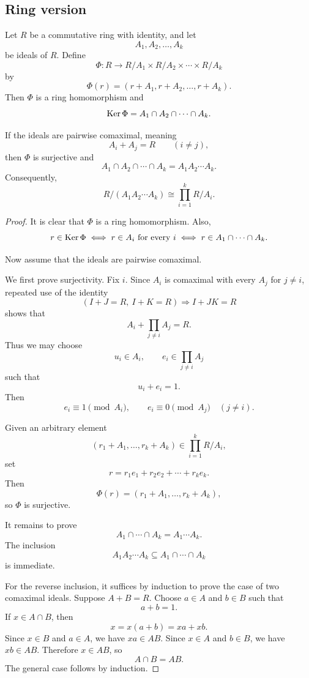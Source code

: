 \subsection{Ring version}

\begin{theorem}\label{thm:crt-ring}
Let $R$ be a commutative ring with identity, and let
\[
    A_1,A_2,\ldots,A_k
\]
be ideals of $R$. Define
\[
    \Phi:R\longrightarrow R/A_1\times R/A_2\times\cdots\times R/A_k
\]
by
\[
    \Phi(r)=(r+A_1,r+A_2,\ldots,r+A_k).
\]
Then $\Phi$ is a ring homomorphism and
\[
    \operatorname{Ker}\Phi=A_1\cap A_2\cap\cdots\cap A_k.
\]

If the ideals are pairwise comaximal, meaning
\[
    A_i+A_j=R
    \qquad(i\neq j),
\]
then $\Phi$ is surjective and
\[
    A_1\cap A_2\cap\cdots\cap A_k=A_1A_2\cdots A_k.
\]
Consequently,
\[
    R/(A_1A_2\cdots A_k)
    \cong
    \prod_{i=1}^k R/A_i.
\]
\end{theorem}

\begin{proof}
It is clear that $\Phi$ is a ring homomorphism. Also,
\[
    r\in\operatorname{Ker}\Phi
    \iff
    r\in A_i\text{ for every }i
    \iff
    r\in A_1\cap\cdots\cap A_k.
\]

Now assume that the ideals are pairwise comaximal.

We first prove surjectivity. Fix $i$. Since $A_i$ is comaximal with every $A_j$ for $j\neq i$, repeated use of the identity
\[
    (I+J=R,\ I+K=R)\Longrightarrow I+JK=R
\]
shows that
\[
    A_i+\prod_{j\neq i}A_j=R.
\]
Thus we may choose
\[
    u_i\in A_i,
    \qquad
    e_i\in\prod_{j\neq i}A_j
\]
such that
\[
    u_i+e_i=1.
\]
Then
\[
    e_i\equiv1\pmod{A_i},
    \qquad
    e_i\equiv0\pmod{A_j}\quad(j\neq i).
\]

Given an arbitrary element
\[
    (r_1+A_1,\ldots,r_k+A_k)
    \in
    \prod_{i=1}^k R/A_i,
\]
set
\[
    r=r_1e_1+r_2e_2+\cdots+r_ke_k.
\]
Then
\[
    \Phi(r)=(r_1+A_1,\ldots,r_k+A_k),
\]
so $\Phi$ is surjective.

It remains to prove
\[
    A_1\cap\cdots\cap A_k=A_1\cdots A_k.
\]
The inclusion
\[
    A_1A_2\cdots A_k\subseteq A_1\cap\cdots\cap A_k
\]
is immediate.

For the reverse inclusion, it suffices by induction to prove the case of two comaximal ideals. Suppose $A+B=R$. Choose $a\in A$ and $b\in B$ such that
\[
    a+b=1.
\]
If $x\in A\cap B$, then
\[
    x=x(a+b)=xa+xb.
\]
Since $x\in B$ and $a\in A$, we have $xa\in AB$. Since $x\in A$ and $b\in B$, we have $xb\in AB$. Therefore $x\in AB$, so
\[
    A\cap B=AB.
\]
The general case follows by induction.
\end{proof}


